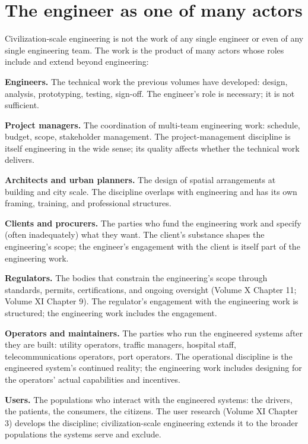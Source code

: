 \section{The engineer as one of many actors}

Civilization-scale engineering is not the work of any single engineer or even of any single engineering team. The work is the product of many actors whose roles include and extend beyond engineering:

\textbf{Engineers.} The technical work the previous volumes have developed: design, analysis, prototyping, testing, sign-off. The engineer's role is necessary; it is not sufficient.

\textbf{Project managers.} The coordination of multi-team engineering work: schedule, budget, scope, stakeholder management. The project-management discipline is itself engineering in the wide sense; its quality affects whether the technical work delivers.

\textbf{Architects and urban planners.} The design of spatial arrangements at building and city scale. The discipline overlaps with engineering and has its own framing, training, and professional structures.

\textbf{Clients and procurers.} The parties who fund the engineering work and specify (often inadequately) what they want. The client's substance shapes the engineering's scope; the engineer's engagement with the client is itself part of the engineering work.

\textbf{Regulators.} The bodies that constrain the engineering's scope through standards, permits, certifications, and ongoing oversight (Volume X Chapter 11; Volume XI Chapter 9). The regulator's engagement with the engineering work is structured; the engineering work includes the engagement.

\textbf{Operators and maintainers.} The parties who run the engineered systems after they are built: utility operators, traffic managers, hospital staff, telecommunications operators, port operators. The operational discipline is the engineered system's continued reality; the engineering work includes designing for the operators' actual capabilities and incentives.

\textbf{Users.} The populations who interact with the engineered systems: the drivers, the patients, the consumers, the citizens. The user research (Volume XI Chapter 3) develops the discipline; civilization-scale engineering extends it to the broader populations the systems serve and exclude.

